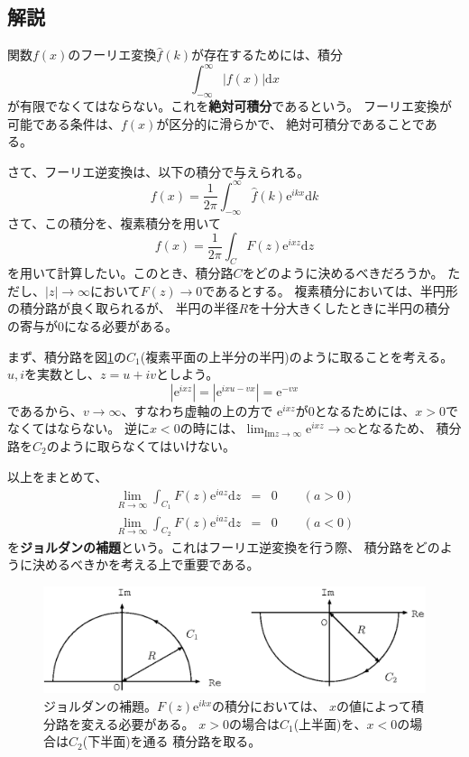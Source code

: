 \documentclass{jarticle}
\newcommand{\diff}{\mathrm d}
\newcommand{\e}{\mathrm e}
\begin{document}
\subsection{解説}

関数$f(x)$のフーリエ変換$\hat{f}(k)$が存在するためには、積分
\begin{equation}
  \int_{-\infty}^{\infty} |f(x)|  \diff x
\end{equation}
が有限でなくてはならない。これを{\bf 絶対可積分}であるという。
フーリエ変換が可能である条件は、$f(x)$が区分的に滑らかで、
絶対可積分であることである。

さて、フーリエ逆変換は、以下の積分で与えられる。
\begin{equation}
  f(x) = \frac{1}{2\pi}\int_{-\infty}^{\infty} \hat{f}(k) \e^{ikx} \diff k
\end{equation}
さて、この積分を、複素積分を用いて
\begin{equation}
  f(x) = \frac{1}{2\pi} \int_{C} F(z) \e^{ixz} \diff z
\end{equation}
を用いて計算したい。このとき、積分路$C$をどのように決めるべきだろうか。
ただし、$|z| \rightarrow \infty$において$F(z) \rightarrow 0$であるとする。
複素積分においては、半円形の積分路が良く取られるが、
半円の半径$R$を十分大きくしたときに半円の積分の寄与が$0$になる必要がある。

まず、積分路を図\ref{fig_jordan}の$C_1$(複素平面の上半分の半円)のように取ることを考える。
$u,i$を実数とし、$z = u + iv$としよう。
\begin{equation}
  |\e^{ixz}| = |\e^{ixu - vx}| = \e^{- vx}
\end{equation}
であるから、$v \rightarrow \infty$、すなわち虚軸の上の方で
$\e^{ixz}$が$0$となるためには、$x>0$でなくてはならない。
逆に$x<0$の時には、$\displaystyle \lim_{\mbox{Im} z \rightarrow \infty} \e^{ixz} \rightarrow \infty$となるため、
積分路を$C_2$のように取らなくてはいけない。

以上をまとめて、
\begin{eqnarray}
  \lim_{R\rightarrow \infty}  \int_{C_1} F(z) \e^{iaz} \diff z &=& 0 \qquad (a>0)\\
  \lim_{R\rightarrow \infty}  \int_{C_2} F(z) \e^{iaz} \diff z &=& 0 \qquad (a<0)
\end{eqnarray}
を{\bf ジョルダンの補題}という。これはフーリエ逆変換を行う際、
積分路をどのように決めるべきかを考える上で重要である。

\begin{figure}[htbp]
  \begin{center}
    \includegraphics[width=.8\linewidth]{fig/jordan.eps}
  \end{center}
  \caption{
    ジョルダンの補題。$F(z)\e^{ikx}$の積分においては、
    $x$の値によって積分路を変える必要がある。
    $x>0$の場合は$C_1$(上半面)を、$x<0$の場合は$C_2$(下半面)を通る
    積分路を取る。
  }
  \label{fig_jordan}
\end{figure}
\end{document}
